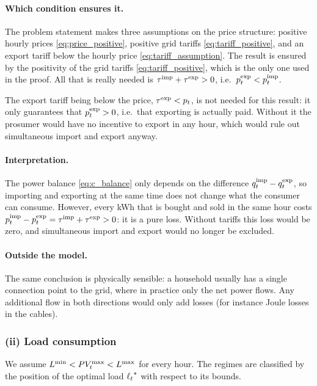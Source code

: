 \paragraph{Which condition ensures it.}
The problem statement makes three assumptions on the price structure: positive hourly prices
\eqref{eq:price_positive}, positive grid tariffs \eqref{eq:tariff_positive}, and an export
tariff below the hourly price \eqref{eq:tariff_assumption}. The result is ensured by the
positivity of the grid tariffs \eqref{eq:tariff_positive}, which is the only one used in the
proof. All that is really needed is $\tau^{\mathrm{imp}} + \tau^{\mathrm{exp}} > 0$, i.e.\ $p^{\mathrm{exp}}_{t} < p^{\mathrm{imp}}_{t}$.

The export tariff being below the price, $\tau^{\mathrm{exp}} < p_t$, is not needed for this result: it
only guarantees that $p^{\mathrm{exp}}_{t} > 0$, i.e.\ that exporting is actually paid. Without it the
prosumer would have no incentive to export in any hour, which would rule out simultaneous
import and export anyway.

\paragraph{Interpretation.}
The power balance \eqref{eq:c_balance} only depends on the difference $q^{\mathrm{imp}}_{t} - q^{\mathrm{exp}}_{t}$, so
importing and exporting at the same time does not change what the consumer can consume.
However, every kWh that is bought and sold in the same hour costs
$p^{\mathrm{imp}}_{t} - p^{\mathrm{exp}}_{t} = \tau^{\mathrm{imp}} + \tau^{\mathrm{exp}} > 0$: it is a pure loss. Without tariffs this loss would be
zero, and simultaneous import and export would no longer be excluded.

\paragraph{Outside the model.}
The same conclusion is physically sensible: a household usually has a single connection point
to the grid, where in practice only the net power flows. Any additional flow in both
directions would only add losses (for instance Joule losses in the cables).

\subsubsection{(ii) Load consumption}
We assume $L^{\min} < PV_{t}^{\max} < L^{\max}$ for every hour. The regimes are classified by the position
of the optimal load ${\ell_{t}}^*$ with respect to its bounds.

